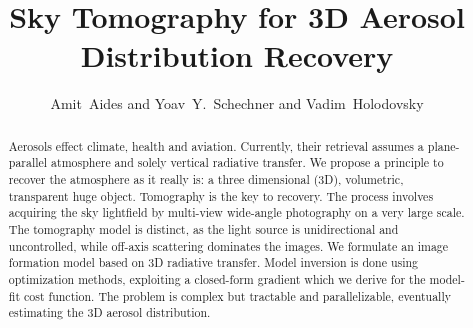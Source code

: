 \documentclass[10pt,letterpaper]{article}
\begin{document}

\title{Sky Tomography for 3D Aerosol Distribution Recovery}

\author{Amit~Aides and Yoav~Y.~Schechner and Vadim~Holodovsky}

\address{Electrical Engineering Dept., Technion - Israel Inst. Tech., \\ Haifa 32000, Israel}





\begin{abstract}
  Aerosols effect climate, health and aviation.  Currently, their
  retrieval assumes a plane-parallel atmosphere and solely vertical
  radiative transfer. We propose a principle to recover the atmosphere
  as it really is: a three dimensional (3D), volumetric, transparent
  huge object. Tomography is the key to recovery. The process involves
  acquiring the sky lightfield by multi-view wide-angle photography on
  a very large scale. The tomography model is distinct, as the light
  source is unidirectional and uncontrolled, while off-axis scattering
  dominates the images.  We formulate an image formation model based
  on 3D radiative transfer. Model inversion is done using optimization
  methods, exploiting a closed-form gradient which we derive for the
  model-fit cost function. The problem is complex but tractable and
  parallelizable, eventually estimating the 3D aerosol distribution.
\end{abstract}


\end{document}
